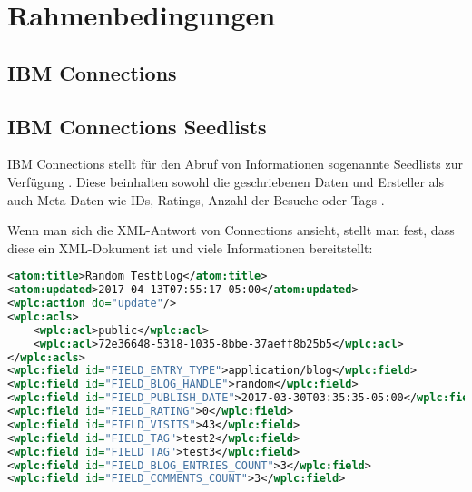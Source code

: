 

\chapter{Rahmenbedingungen}




\section{IBM Connections}

\newpage


\section{IBM Connections Seedlists}
IBM Connections stellt für den Abruf von Informationen sogenannte Seedlists zur Verfügung \cite{conn2}. Diese beinhalten sowohl die geschriebenen Daten und Ersteller als auch Meta-Daten wie IDs, Ratings, Anzahl der Besuche oder Tags \cite{resp}. 

Wenn man sich die XML-Antwort von Connections ansieht, stellt man fest, dass diese ein XML-Dokument ist und viele Informationen bereitstellt: \\

\noindent
\begin{minipage}{\linewidth}
\begin{lstlisting}[title=Auszug aus einer XML-Antwort von der Connections Blogs-Applikation, language=XML]
<atom:title>Random Testblog</atom:title>
<atom:updated>2017-04-13T07:55:17-05:00</atom:updated>
<wplc:action do="update"/>
<wplc:acls>
	<wplc:acl>public</wplc:acl>
	<wplc:acl>72e36648-5318-1035-8bbe-37aeff8b25b5</wplc:acl>
</wplc:acls>
<wplc:field id="FIELD_ENTRY_TYPE">application/blog</wplc:field>
<wplc:field id="FIELD_BLOG_HANDLE">random</wplc:field>
<wplc:field id="FIELD_PUBLISH_DATE">2017-03-30T03:35:35-05:00</wplc:field>
<wplc:field id="FIELD_RATING">0</wplc:field>
<wplc:field id="FIELD_VISITS">43</wplc:field>
<wplc:field id="FIELD_TAG">test2</wplc:field>
<wplc:field id="FIELD_TAG">test3</wplc:field>
<wplc:field id="FIELD_BLOG_ENTRIES_COUNT">3</wplc:field>
<wplc:field id="FIELD_COMMENTS_COUNT">3</wplc:field>
\end{lstlisting}
\end{minipage}

